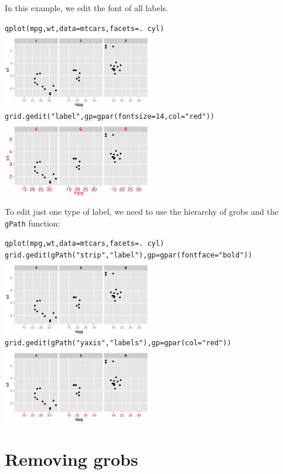 In this example, we edit the font of all labels.

\begin{alltt}
qplot(mpg, wt, data=mtcars, facets = . ~ cyl)
\includegraphics[width=0.5\textwidth]{grid1}
grid.gedit("label", gp=gpar(fontsize=14, col="red"))
\includegraphics[width=0.5\textwidth]{grid2}
\end{alltt}

To edit just one type of label, we need to use the hierarchy of grobs and the {\tt gPath} function:

\begin{alltt}
qplot(mpg, wt, data=mtcars, facets = . ~ cyl)
grid.gedit(gPath("strip","label"), gp=gpar(fontface="bold"))
\includegraphics[width=0.5\textwidth]{grid3}
grid.gedit(gPath("yaxis", "labels"), gp=gpar(col="red"))
\includegraphics[width=0.5\textwidth]{grid4}
\end{alltt}

\section{Removing grobs}
\label{sec:grid-delete}

